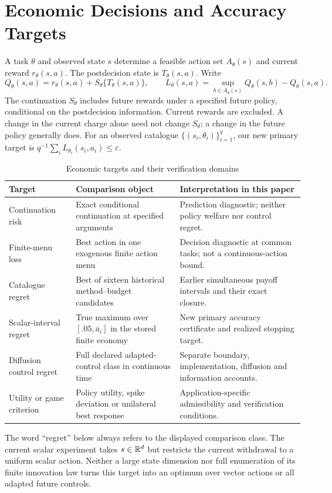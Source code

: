 \section{Economic Decisions and Accuracy Targets}\label{sec:r19targets}
A task $\theta$ and observed state $s$ determine a feasible action set
$A_\theta(s)$ and current reward $r_\theta(s,a)$. The postdecision state is
$T_\theta(s,a)$. Write
\begin{equation}
 Q_\theta(s,a)=r_\theta(s,a)+S_\theta\{T_\theta(s,a)\},\qquad
 L_\theta(s,a)=\sup_{b\in A_\theta(s)}Q_\theta(s,b)-Q_\theta(s,a).
 \label{eq:r19objective}
\end{equation}
The continuation $S_\theta$ includes future rewards under a specified future
policy, conditional on the postdecision information. Current rewards are
excluded. A change in the current charge alone need not change $S_\theta$;
a change in the future policy generally does. For an observed catalogue
$\{(s_i,\theta_i)\}_{i=1}^q$, our new primary target is
$q^{-1}\sum_i L_{\theta_i}(s_i,a_i)\leq\varepsilon$.

\begin{table}[htbp]\centering\small
\caption{Economic targets and their verification domains}\label{tab:r19targets}
\begin{tabular}{p{}p{}p{}}
\toprule Target & Comparison object & Interpretation in this paper\\\midrule
Continuation risk & Exact conditional continuation at specified arguments &
Prediction diagnostic; neither policy welfare nor control regret.\\
Finite-menu loss & Best action in one exogenous finite action menu &
Decision diagnostic at common tasks; not a continuous-action bound.\\
Catalogue regret & Best of sixteen historical method--budget candidates &
Earlier simultaneous payoff intervals and their exact closure.\\
Scalar-interval regret & True maximum over $[.05,\bar a_i]$ in the stored finite economy &
New primary accuracy certificate and realized stopping target.\\
Diffusion control regret & Full declared adapted-control class in continuous time &
Separate boundary, implementation, diffusion and information accounts.\\
Utility or game criterion & Policy utility, spike deviation or unilateral best response &
Application-specific admissibility and verification conditions.\\\bottomrule
\end{tabular}
\end{table}

The word ``regret'' below always refers to the displayed comparison class.
The current scalar experiment takes $s\in\mathbb R^d$ but restricts the current
withdrawal to a uniform scalar action. Neither a large state dimension nor
full enumeration of its finite innovation law turns this target into an
optimum over vector actions or all adapted future controls.
